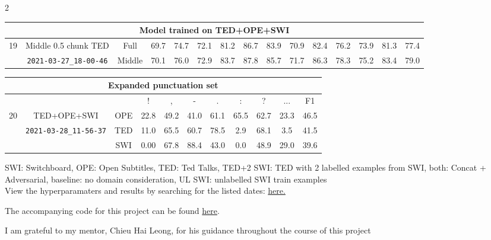 \documentclass[a4paper]{article}
\begin{document}
\begin{multicols}{2}
\begin{table*}[t]
\begin{tabular}{|c|c|c|c c c|c c c|c c c|c c c|}
\multicolumn{15}{|c|}{Model trained on TED+OPE+SWI}\\\hline
\multirow{2}{*}{19}&
Middle 0.5 chunk TED&Full &69.7&74.7&72.1&81.2&86.7&83.9&70.9&82.4&76.2&73.9&81.3&77.4\\&
\verb|2021-03-27_18-00-46|&Middle& 70.1&76.0&72.9&83.7&87.8&85.7&71.7&86.3&78.3&75.2&83.4&79.0\\\hline
\end{tabular}
\begin{tabular}{|c|c|c|c|c|c|c|c|c|c|c|}
\multicolumn{11}{|c|}{Expanded punctuation set}\\\hline
&&&!&,&-&.&:&?&...&F1\\\hline
\multirow{2}{*}{20}&
TED+OPE+SWI&OPE&22.8 &49.2&   41.0&   61.1&   65.5&   62.7&   23.3&   46.5 \\&
\verb|2021-03-28_11-56-37|&TED&11.0 &65.5&   60.7&   78.5&    2.9&   68.1&    3.5&   41.5   \\
&&SWI& 0.00 &67.8&   88.4&   43.0&    0.0&   48.9&   29.0&   39.6\\\hline

\end{tabular}

\caption{Study of effect of different parameters on performance of transfer to Switchboard dataset}
SWI: Switchboard, OPE: Open Subtitles, TED: Ted Talks, 
TED+2 SWI: TED with 2 labelled examples from SWI, both: Concat + Adversarial, baseline: no domain consideration,
UL SWI: unlabelled SWI train examples \\
View the hyperparamaters and results by searching for the listed dates:  \href{https://github.com/ngxingyu/Transfer-Learning-for-Punctuation-Retrieval/tree/main/Punctuation_with_Domain_discriminator/results}{here.}\\
\label{table:baseline}
\end{table*}

\begin{appendices}
The accompanying code for this project can be found \href{https://github.com/ngxingyu/Transfer-Learning-for-Punctuation-Retrieval/}{here}.

I am grateful to my mentor, Chieu Hai Leong, for his guidance throughout the course of this project

\end{appendices}
\end{multicols}
\end{document}
